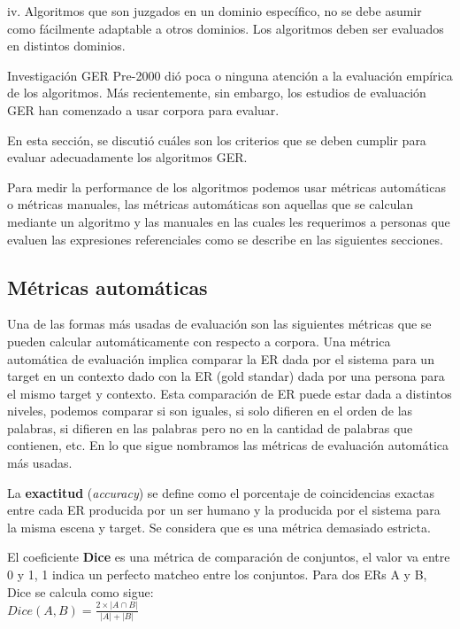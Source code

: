 iv. Algoritmos que son juzgados en un dominio espec\'ifico, no se debe asumir como
f\'acilmente adaptable a otros dominios. Los algoritmos deben ser evaluados en distintos dominios.

Investigaci\'on GER Pre-2000 di\'o poca o ninguna atenci\'on a la evaluaci\'on emp\'irica de los algoritmos. M\'as 
recientemente, sin embargo, los estudios de evaluaci\'on GER han comenzado a usar corpora para evaluar.

En esta secci\'on, se discuti\'o cu\'ales son los criterios que se deben cumplir
para evaluar adecuadamente los algoritmos GER.

Para medir la performance de los algoritmos podemos usar m\'etricas autom\'aticas o m\'etricas manuales, las m\'etricas autom\'aticas son aquellas que se calculan mediante un algoritmo y las manuales en las cuales les requerimos a personas que evaluen las expresiones referenciales como se describe en las siguientes secciones.


\subsection{M\'etricas autom\'aticas}
\label{sec:metricasAutomaticas}

Una de las formas m\'as usadas de evaluaci\'on son las siguientes m\'etricas que se pueden calcular autom\'aticamente con respecto a corpora.
Una m\'etrica autom\'atica de evaluaci\'on implica comparar la ER dada por el sistema para un target en un contexto dado con la ER (gold standar) dada por una persona para el mismo target y contexto.
Esta comparaci\'on de ER puede estar dada a distintos niveles, podemos comparar si son iguales, si solo difieren en el orden de las palabras, si difieren en las palabras pero no en la cantidad de palabras que contienen, etc. En lo que sigue nombramos las m\'etricas de evaluaci\'on autom\'atica m\'as usadas.

La \textbf{exactitud} ({\it accuracy}) se define como el porcentaje de coincidencias exactas entre cada ER producida por un ser humano y la producida por el sistema para la misma escena y target. Se considera que es una m\'etrica demasiado estricta.

El coeficiente \textbf{Dice} es una m\'etrica de comparaci\'on de conjuntos, el valor va entre 0 y 1, 1 indica un perfecto matcheo entre los conjuntos. Para dos ERs A y B, Dice se calcula como sigue:\\

$Dice(A,B) = \frac{2\times|A \cap B|}{|A|+|B|}$\\

